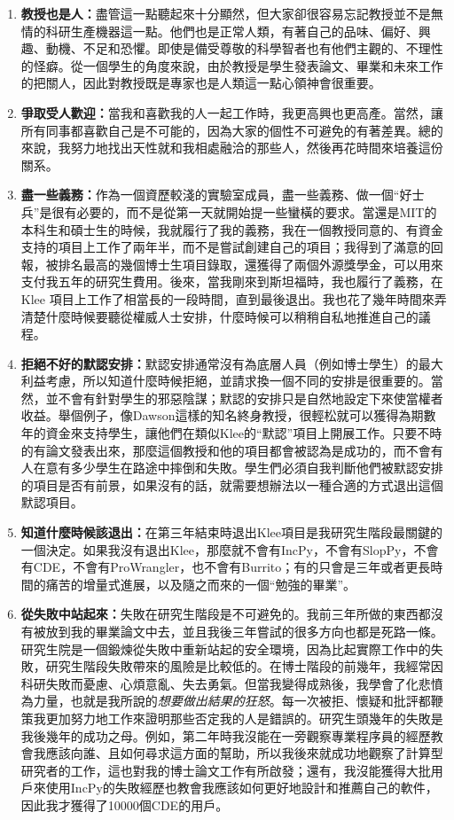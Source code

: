\documentclass[12pt,UTF8,nofonts]{book}
\begin{document}
\begin{enumerate}
  \item \textbf{教授也是人：}盡管這一點聽起來十分顯然，但大家卻很容易忘記教授並不是無情的科研生產機器這一點。他們也是正常人類，有著自己的品味、偏好、興趣、動機、不足和恐懼。即使是備受尊敬的科學智者也有他們主觀的、不理性的怪癖。從一個學生的角度來說，由於教授是學生發表論文、畢業和未來工作的把關人，因此對教授既是專家也是人類這一點心領神會很重要。
  \item \textbf{爭取受人歡迎：}當我和喜歡我的人一起工作時，我更高興也更高產。當然，讓所有同事都喜歡自己是不可能的，因為大家的個性不可避免的有著差異。總的來說，我努力地找出天性就和我相處融洽的那些人，然後再花時間來培養這份關系。
  \item \textbf{盡一些義務：}作為一個資歷較淺的實驗室成員，盡一些義務、做一個“好士兵”是很有必要的，而不是從第一天就開始提一些蠻橫的要求。當還是MIT的本科生和碩士生的時候，我就履行了我的義務，我在一個教授同意的、有資金支持的項目上工作了兩年半，而不是嘗試創建自己的項目；我得到了滿意的回報，被排名最高的幾個博士生項目錄取，還獲得了兩個外源獎學金，可以用來支付我五年的研究生費用。後來，當我剛來到斯坦福時，我也履行了義務，在Klee 項目上工作了相當長的一段時間，直到最後退出。我也花了幾年時間來弄清楚什麼時候要聽從權威人士安排，什麼時候可以稍稍自私地推進自己的議程。
  \item \textbf{拒絕不好的默認安排：}默認安排通常沒有為底層人員（例如博士學生）的最大利益考慮，所以知道什麼時候拒絕，並請求換一個不同的安排是很重要的。當然，並不會有針對學生的邪惡陰謀；默認的安排只是自然地設定下來使當權者收益。舉個例子，像Dawson這樣的知名終身教授，很輕松就可以獲得為期數年的資金來支持學生，讓他們在類似Klee的“默認”項目上開展工作。只要不時的有論文發表出來，那麼這個教授和他的項目都會被認為是成功的，而不會有人在意有多少學生在路途中摔倒和失敗。學生們必須自我判斷他們被默認安排的項目是否有前景，如果沒有的話，就需要想辦法以一種合適的方式退出這個默認項目。
  \item \textbf{知道什麼時候該退出：}在第三年結束時退出Klee項目是我研究生階段最關鍵的一個決定。如果我沒有退出Klee，那麼就不會有IncPy，不會有SlopPy，不會有CDE，不會有ProWrangler，也不會有Burrito；有的只會是三年或者更長時間的痛苦的增量式進展，以及隨之而來的一個“勉強的畢業”。
  \item \textbf{從失敗中站起來：}失敗在研究生階段是不可避免的。我前三年所做的東西都沒有被放到我的畢業論文中去，並且我後三年嘗試的很多方向也都是死路一條。研究生院是一個鍛煉從失敗中重新站起的安全環境，因為比起實際工作中的失敗，研究生階段失敗帶來的風險是比較低的。在博士階段的前幾年，我經常因科研失敗而憂慮、心煩意亂、失去勇氣。但當我變得成熟後，我學會了化悲憤為力量，也就是我所說的\emph{想要做出結果的狂怒}。每一次被拒、懷疑和批評都鞭策我更加努力地工作來證明那些否定我的人是錯誤的。研究生頭幾年的失敗是我後幾年的成功之母。例如，第二年時我沒能在一旁觀察專業程序員的經歷教會我應該向誰、且如何尋求這方面的幫助，所以我後來就成功地觀察了計算型研究者的工作，這也對我的博士論文工作有所啟發；還有，我沒能獲得大批用戶來使用IncPy的失敗經歷也教會我應該如何更好地設計和推薦自己的軟件，因此我才獲得了10000個CDE的用戶。

\end{enumerate}
\end{document}
